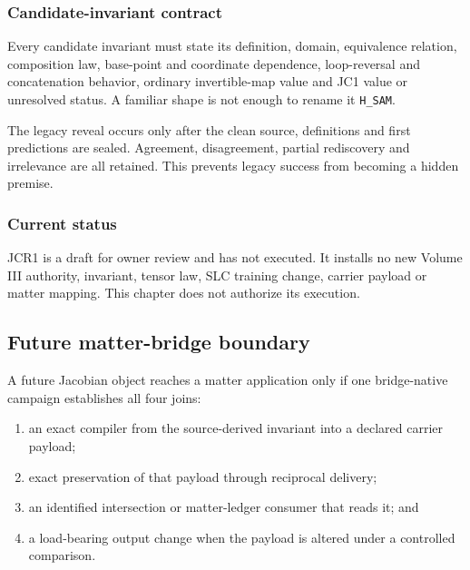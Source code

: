 \subsubsection{Candidate-invariant
contract}\label{viii-ch11-candidate-invariant-contract}

Every candidate invariant must state its definition, domain, equivalence
relation, composition law, base-point and coordinate dependence,
loop-reversal and concatenation behavior, ordinary invertible-map value
and JC1 value or unresolved status. A familiar shape is not enough to
rename it \texttt{H\_SAM}.

The legacy reveal occurs only after the clean source, definitions and
first predictions are sealed. Agreement, disagreement, partial
rediscovery and irrelevance are all retained. This prevents legacy
success from becoming a hidden premise.

\subsubsection{Current status}\label{viii-ch11-current-status}

JCR1 is a draft for owner review and has not executed. It installs no
new Volume III authority, invariant, tensor law, SLC training change,
carrier payload or matter mapping. This chapter does not authorize its
execution.

\subsection{Future matter-bridge
boundary}\label{viii-ch11-future-matter-bridge-boundary}

A future Jacobian object reaches a matter application only if one
bridge-native campaign establishes all four joins:

\begin{enumerate}
\def\labelenumi{\arabic{enumi}.}
\tightlist
\item
  an exact compiler from the source-derived invariant into a declared
  carrier payload;
\item
  exact preservation of that payload through reciprocal delivery;
\item
  an identified intersection or matter-ledger consumer that reads it;
  and
\item
  a load-bearing output change when the payload is altered under a
  controlled comparison.
\end{enumerate}

